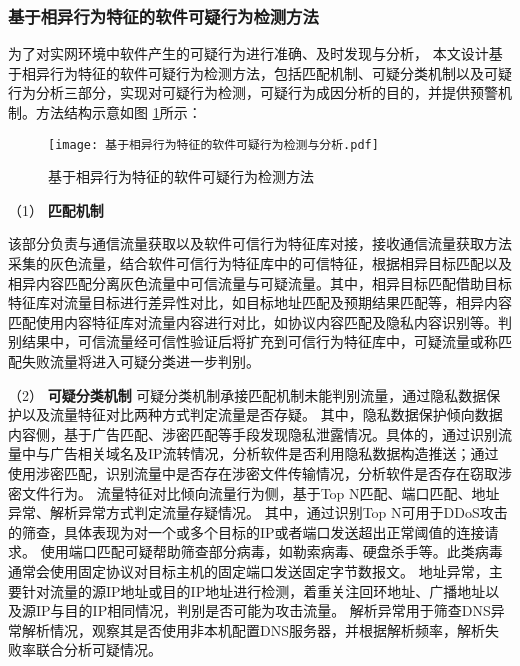 \subsubsection{基于相异行为特征的软件可疑行为检测方法}

为了对实网环境中软件产生的可疑行为进行准确、及时发现与分析，
本文设计基于相异行为特征的软件可疑行为检测方法，包括匹配机制、可疑分类机制以及可疑行为分析三部分，实现对可疑行为检测，可疑行为成因分析的目的，并提供预警机制。方法结构示意如图 \ref{fig:基于相异行为特征的软件可疑行为检测方法}所示：

\FloatBarrier
 
\begin{figure}[ht]
  \centering
  \texttt{[image: 基于相异行为特征的软件可疑行为检测与分析.pdf]}
  \caption{基于相异行为特征的软件可疑行为检测方法}
  \label{fig:基于相异行为特征的软件可疑行为检测方法}
\end{figure} 

\FloatBarrier

（1） \textbf{匹配机制}\quad

该部分负责与通信流量获取以及软件可信行为特征库对接，接收通信流量获取方法采集的灰色流量，结合软件可信行为特征库中的可信特征，根据相异目标匹配以及相异内容匹配分离灰色流量中可信流量与可疑流量。其中，相异目标匹配借助目标特征库对流量目标进行差异性对比，如目标地址匹配及预期结果匹配等，相异内容匹配使用内容特征库对流量内容进行对比，如协议内容匹配及隐私内容识别等。判别结果中，可信流量经可信性验证后将扩充到可信行为特征库中，可疑流量或称匹配失败流量将进入可疑分类进一步判别。

（2） \textbf{可疑分类机制}\quad
可疑分类机制承接匹配机制未能判别流量，通过隐私数据保护以及流量特征对比两种方式判定流量是否存疑。
其中，隐私数据保护倾向数据内容侧，基于广告匹配、涉密匹配等手段发现隐私泄露情况。具体的，通过识别流量中与广告相关域名及IP流转情况，分析软件是否利用隐私数据构造推送；通过使用涉密匹配，识别流量中是否存在涉密文件传输情况，分析软件是否存在窃取涉密文件行为。
流量特征对比倾向流量行为侧，基于Top N匹配、端口匹配、地址异常、解析异常方式判定流量存疑情况。
其中，通过识别Top N可用于DDoS攻击的筛查，具体表现为对一个或多个目标的IP或者端口发送超出正常阈值的连接请求。
使用端口匹配可疑帮助筛查部分病毒，如勒索病毒、硬盘杀手等。此类病毒通常会使用固定协议对目标主机的固定端口发送固定字节数报文。
地址异常，主要针对流量的源IP地址或目的IP地址进行检测，着重关注回环地址、广播地址以及源IP与目的IP相同情况，判别是否可能为攻击流量。
解析异常用于筛查DNS异常解析情况，观察其是否使用非本机配置DNS服务器，并根据解析频率，解析失败率联合分析可疑情况。
 
